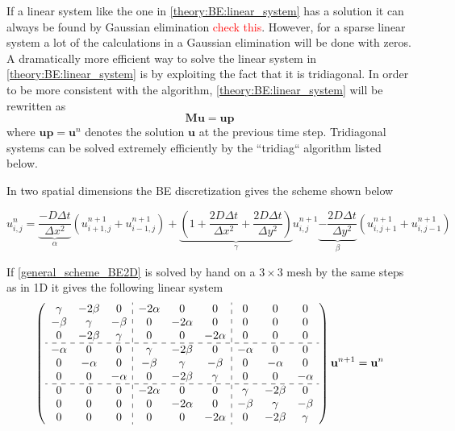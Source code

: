\noindent If a linear system like the one in \eqref{theory:BE:linear_system} has a solution it can always be found by Gaussian elimination \textcolor{red}{check this}. 
However, for a sparse linear system a lot of the calculations in a Gaussian elimination will be done with zeros. 
A dramatically more efficient way to solve the linear system in \eqref{theory:BE:linear_system} is by exploiting the fact that it is tridiagonal. 
In order to be more consistent with the algorithm, \eqref{theory:BE:linear_system} will be rewritten as
\begin{equation}
  \mathbf{M}\mathbf{u} = \mathbf{up}
\end{equation}
where $\mathbf{up} = \mathbf{u}^{n}$ denotes the solution $\mathbf{u}$ at the previous time step. 
Tridiagonal systems can be solved extremely efficiently by the ``tridiag`` algorithm listed below.



In two spatial dimensions the BE discretization gives the scheme shown below

\begin{equation}\label{general_scheme_BE2D}
 u^{n}_{i,j} = \underbrace{\frac{-D\Delta t}{\Delta x^2}}_{\alpha}\left(u^{n+1}_{i+1,j}+u^{n+1}_{i-1,j}\right) +
 \underbrace{\left(1+\frac{2D\Delta t}{\Delta x^2} +\frac{2D\Delta t}{\Delta y^2}\right)}_{\gamma}u^{n+1}_{i,j} 
 \underbrace{-\frac{2D\Delta t}{\Delta y^2}}_{\beta}\left(u^{n+1}_{i,j+1}+u^{n+1}_{i,j-1}\right)
\end{equation}

\noindent If \eqref{general_scheme_BE2D} is solved by hand on a $3\times3$ mesh by the same steps as in 1D it gives the following linear system
\begin{align}\label{linear_system_BE2D}
  \left(\begin{array}{c c c : c c c : c c c}
        \gamma & -2\beta &0 &-2\alpha &0 &0 &0 &0 &0\\
        -\beta & \gamma & -\beta &0 &-2\alpha &0 &0 &0 &0\\
        0&-2\beta & \gamma & 0 & 0 & -2\alpha &0&0&0\\ \hdashline
        -\alpha& 0&0 & \gamma & -2\beta & 0 & -\alpha &0&0\\
        0& -\alpha&0&-\beta & \gamma & -\beta & 0 & -\alpha &0\\
        0& 0& -\alpha&0&-2\beta & \gamma & 0 & 0 &-\alpha\\ \hdashline
        0& 0 &0 &-2\alpha &0&0 & \gamma & -2\beta&0\\
        0& 0 &0 &0 &-2\alpha&0&-\beta & \gamma &-\beta\\
         0&0 &0 &0&0 &-2\alpha&0&-2\beta & \gamma
       \end{array}\right)\mathbf{u}^{n+1} = \mathbf{u}^{n}
\end{align}

